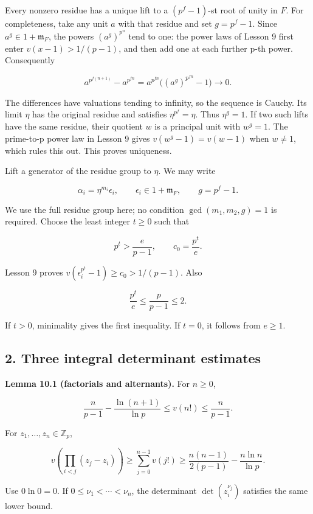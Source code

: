 \documentclass[
  11pt,
  a4paper,
]{article}
\begin{document}
Every nonzero residue has a unique lift to a \((p^f-1)\)-st root of
unity in \(F\). For completeness, take any unit \(a\) with that residue
and set \(g=p^f-1\). Since \(a^g\in1+\mathfrak m_F\), the powers
\((a^g)^{p^n}\) tend to one: the power laws of Lesson 9 first enter
\(v(x-1)>1/(p-1)\), and then add one at each further p-th power.
Consequently

\[
a^{p^{f(n+1)}}-a^{p^{fn}}
=a^{p^{fn}}\bigl((a^g)^{p^{fn}}-1\bigr)\longrightarrow0.
\]

The differences have valuations tending to infinity, so the sequence is
Cauchy. Its limit \(\eta\) has the original residue and satisfies
\(\eta^{p^f}=\eta\). Thus \(\eta^g=1\). If two such lifts have the same
residue, their quotient \(w\) is a principal unit with \(w^g=1\). The
prime-to-p power law in Lesson 9 gives \(v(w^g-1)=v(w-1)\) when
\(w\ne1\), which rules this out. This proves uniqueness.

Lift a generator of the residue group to \(\eta\). We may write

\[
\alpha_i=\eta^{m_i}\epsilon_i,
\qquad \epsilon_i\in1+\mathfrak m_F,
\qquad g=p^f-1.
\tag{10.1}
\]

We use the full residue group here; no condition \(\gcd(m_1,m_2,g)=1\)
is required. Choose the least integer \(t\ge0\) such that

\[
p^t>\frac e{p-1},\qquad c_0=\frac{p^t}e.
\tag{10.2}
\]

Lesson 9 proves \(v(\epsilon_i^{p^t}-1)\ge c_0>1/(p-1)\). Also

\[
\frac{p^t}e\le\frac p{p-1}\le2.
\tag{10.3}
\]

If \(t>0\), minimality gives the first inequality. If \(t=0\), it
follows from \(e\ge1\).

\subsection{2. Three integral determinant
estimates}\label{three-integral-determinant-estimates}

\textbf{Lemma 10.1 (factorials and alternants).} For \(n\ge0\),

\[
\frac n{p-1}-\frac{\ln(n+1)}{\ln p}
\le v(n!)\le\frac n{p-1}.
\tag{10.4}
\]

For \(z_1,\ldots,z_n\in\mathbb Z_p\),

\[
v\!\left(\prod_{i<j}(z_j-z_i)\right)
\ge\sum_{j=0}^{n-1}v(j!)
\ge\frac{n(n-1)}{2(p-1)}-\frac{n\ln n}{\ln p}.
\tag{10.5}
\]

Use \(0\ln0=0\). If \(0\le\nu_1<\cdots<\nu_n\), the determinant
\(\det(z_i^{\nu_j})\) satisfies the same lower bound.
\end{document}
